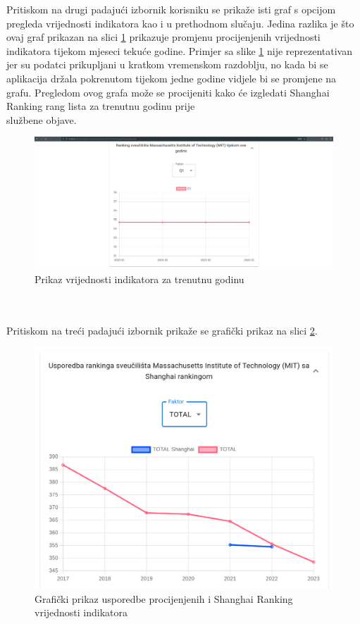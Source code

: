 \documentclass[times, utf8, zavrsni]{fer}
\begin{document}
Pritiskom na drugi padajući izbornik korisniku se prikaže isti graf s opcijom pregleda vrijednosti indikatora
kao i u prethodnom slučaju. Jedina razlika je što ovaj graf prikazan na slici \ref{fig:uni3}
prikazuje promjenu procijenjenih vrijednosti indikatora tijekom mjeseci tekuće godine. Primjer sa slike \ref{fig:uni3} nije reprezentativan jer su podatci 
prikupljani u kratkom vremenskom razdoblju, no kada bi se aplikacija držala pokrenutom tijekom jedne godine vidjele bi se promjene na grafu. Pregledom ovog 
grafa može se procijeniti kako će izgledati Shanghai Ranking rang lista za trenutnu godinu prije \\službene objave. 
\begin{figure}[htb]
    \hspace*{-2cm}  
       \includegraphics[scale=0.21]{uni3.png} 
       \caption{Prikaz vrijednosti indikatora za trenutnu godinu}
       \label{fig:uni3}
       \end{figure} 
\\\\Pritiskom na treći padajući izbornik prikaže se grafički prikaz na slici \ref{fig:uni4}. 
\begin{figure}[htb]
    \centering
       \includegraphics[scale=0.17]{uni4.png} 
       \caption{Grafički prikaz usporedbe procijenjenih i Shanghai Ranking vrijednosti indikatora}
       \label{fig:uni4}
       \end{figure} 
\end{document}
